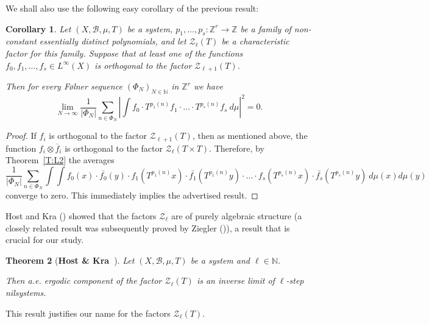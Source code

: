 \documentclass[11pt]{amsart}
\newcommand{\cB}{\mathcal{B}}
\newcommand{\cZ}{\mathcal{Z}}
\newcommand{\N}{\mathbb{N}}
\newcommand{\Z}{\mathbb{Z}}
\theoremstyle{plain}
\newtheorem{theorem}{Theorem}[section]
\newtheorem{corollary}[theorem]{Corollary}
\theoremstyle{definition}
\theoremstyle{remark}
\begin{document}
We shall also use the following easy corollary of the previous result:
\begin{corollary}\label{C:L2'}
 Let $(X,\cB,\mu,T)$ be a system,  $p_1,\ldots,p_s\colon \Z^r\to \Z$ be a family of
 non-constant essentially distinct polynomials,
  and
  let $\mathcal{Z}_\ell(T)$ be a characteristic factor for this
  family.  Suppose that at least one of the functions $f_0,f_1,\ldots,f_s\in
  L^\infty(X)$  is orthogonal to the
  factor $\mathcal{Z}_{\ell+1}(T)$.

   Then for every F{\o}lner sequence
  $(\Phi_N)_{N\in\N}$ in $\Z^r$ we have
$$
\lim_{N\to\infty}\frac{1}{|\Phi_N|}\sum_{n\in \Phi_N}\left|\int
  f_0\cdot T^{p_1(n)}f_1\cdot\ldots\cdot T^{p_s(n)}f_s \
  d\mu\right|^2=0.
$$
\end{corollary}
\begin{proof}
  If $f_i$ is orthogonal to the factor $\mathcal{Z}_{\ell+1}(T)$, then
as mentioned above, the function   $f_i\otimes \overline{f}_i$ is orthogonal to the factor
  $\mathcal{Z}_{\ell}(T\times T)$. Therefore, by Theorem~\ref{T:L2} the averages
$$
\frac{1}{|\Phi_N|}\sum_{n\in \Phi_N}\int \int f_0(x) \cdot
\bar{f_0}(y)\cdot f_1(T^{p_1(n)}x)\cdot \bar{f_1}(T^{p_1(n)}y)\cdot
\ldots \cdot f_s(T^{p_s(n)}x)\cdot \bar{f_s}(T^{p_s(n)}y)\
d\mu(x)d\mu(y)
$$
converge to zero. This immediately implies the advertised result.
\end{proof}
Host and Kra (\cite{HK1}) showed that the factors $\mathcal{Z}_\ell$
are of purely algebraic structure (a closely related result was
subsequently proved by Ziegler (\cite{Z})), a result that is crucial
for our study.
\begin{theorem}[{\bf Host \& Kra~\cite{HK1}}]\label{T:HoKra}
  Let $(X,\mathcal{B},\mu,T)$ be a system and $\ell\in \N$.

  Then  a.e. ergodic
   component of the  factor $\mathcal{Z}_\ell(T)$ is an inverse limit of $\ell$-step
  nilsystems.
\end{theorem}
This result  justifies our name for the factors $\mathcal{Z}_\ell(T)$.
\end{document}
